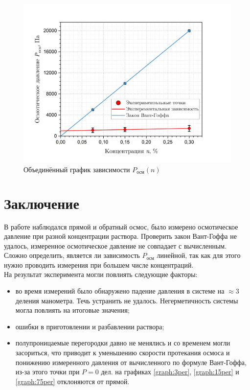 \documentclass[a4paper, 12pt]{article}
\begin{document}
     \begin{figure}[H]
        \centering
        \includegraphics[width = 14 cm]{images/graph_unity.png}
        \caption{Объединённый график зависимости $P_\text{осм}(n)$}
        \label{graph:unity}
    \end{figure}
    
    \section{Заключение}
    
    \noindent В работе наблюдался прямой и обратный осмос, было измерено осмотическое давление при разной концентрации раствора. Проверить закон Вант-Гоффа не удалось, измеренное осмотическое давление не совпадает с вычисленным. Сложно определить, является ли зависимость $P_{осм}$ линейной, так как для этого нужно проводить измерения при большем числе концентраций. \\

    \noindent На результат эксперимента могли повлиять следующие факторы:
    \begin{itemize}
        \item во время измерений было обнаружено падение давления в системе на $\approx 3$ деления манометра. Течь устранить не удалось. Негерметичность системы могла повлиять на итоговые значения;
        \item ошибки в приготовлении и разбавлении раствора;
        \item полупроницаемые перегородки давно не менялись и со временем могли засориться, что приводит к уменьшению скорости протекания осмоса и понижению измеренного давления от вычисленного по формуле Вант-Гоффа, из-за этого точки при $P = 0 \text{ дел.}$ на графиках \ref{graph:3per}, \ref{graph:15per} и \ref{graph:75per} отклоняются от прямой.
    \end{itemize}
\end{document}

